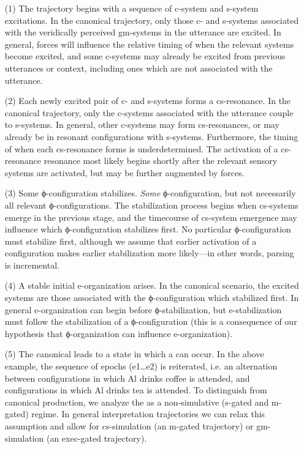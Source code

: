 \begin{enumerate}
\item[(1)]
The trajectory begins with a sequence of c-system and s-system excitations. In the canonical trajectory, only those c- and s-systems associated with the veridically perceived gm-systems in the utterance are excited. In general,  forces will influence the relative timing of when the relevant systems become excited, and some c-systems may already be excited from previous utterances or context, including ones which are not associated with the utterance. 
\item[(2)]
Each newly excited pair of c- and s-systems forms a cs-resonance. In the canonical trajectory, only the c-systems associated with the utterance couple to s-systems. In general, other c-systems may form cs-resonances, or may already be in resonant configurations with s-systems. Furthermore, the timing of when each cs-resonance forms is underdetermined. The activation of a cs-resonance resonance most likely begins shortly after the relevant sensory systems are activated, but may be further augmented by  forces.
\item[(3)]
Some ϕ-configuration stabilizes. \textit{Some} ϕ-configuration, but not necessarily all relevant ϕ-configurations. The stabilization process begins when cs-systems emerge in the previous stage, and the timecourse of cs-system emergence may influence which ϕ-configuration stabilizes first. No particular ϕ-configuration must stabilize first, although we assume that earlier activation of a configuration makes earlier stabilization more likely—in other words, parsing is incremental. 
\item[(4)]
A stable initial e-organization arises. In the canonical scenario, the excited systems are those associated with the ϕ-configuration which stabilized first. In general e-organization can begin before ϕ-stabilization, but e-stabilization must follow the stabilization of a ϕ-configuration (this is a consequence of our hypothesis that ϕ-organization can influence e-organization). 
\item[(5)]
The canonical  leads to a state in which a  can occur. In the above example, the sequence of epochs (e1…e2) is reiterated, i.e. an alternation between configurations in which {\textbar}Al drinks coffee{\textbar} is attended, and configurations in which {\textbar}Al drinks tea{\textbar} is attended. To distinguish  from canonical production, we analyze the  as a non-simulative (s-gated and m-gated) regime. In general interpretation trajectories we can relax this assumption and allow for cs-simulation (an m-gated trajectory) or gm-simulation (an exec-gated trajectory).
\end{enumerate}

